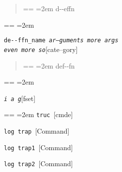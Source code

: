 \documentclass{book}
\makeatletter
\newcommand\GNUTexinfocommandstyletextvar[1]{{\normalfont{}\textsl{#1}}}%
\newenvironment{GNUTexinfopreformatted}{%
  \par\obeylines\obeyspaces\frenchspacing
  \parskip=\z@\parindent=\z@}{}
\makeatother
\begin{document}
%
\begin{quote}
\unskip{\parskip=0pt\noindent}%
\begin{GNUTexinfopreformatted}
\leftskip=2em\relax\ttfamily%
d{-}{-}effn
\end{GNUTexinfopreformatted}
\end{quote}
\begin{GNUTexinfopreformatted}
\leftskip=2em\relax\ttfamily%

\end{GNUTexinfopreformatted}
\noindent\texttt{de{-}{-}ffn\_name \EmbracOn{}\textnormal{\textsl{ar--guments    more args \leavevmode{}\\ even more so}}\EmbracOff{}}\hfill[cate--gory]



%
\begin{quote}
\unskip{\parskip=0pt\noindent}%
\begin{GNUTexinfopreformatted}
\leftskip=2em\relax\ttfamily%
def{-}{-}fn
\end{GNUTexinfopreformatted}
\end{quote}
\begin{GNUTexinfopreformatted}
\leftskip=2em\relax\ttfamily%

\end{GNUTexinfopreformatted}
\noindent\texttt{\GNUTexinfocommandstyletextvar{i} \EmbracOn{}\textnormal{\textsl{a g}}\EmbracOff{}}\hfill[fset]



\index[fn]{i@\texttt{\GNUTexinfocommandstyletextvar{i}}}%
\begin{GNUTexinfopreformatted}
\leftskip=2em\relax\ttfamily%
%
\end{GNUTexinfopreformatted}
\noindent\texttt{truc \EmbracOn{}\textnormal{\textsl{}}\EmbracOff{}}\hfill[cmde]



%
\noindent\texttt{log trap \EmbracOn{}\textnormal{\textsl{}}\EmbracOff{}}\hfill[Command]



%
\noindent\texttt{log trap1 \EmbracOn{}\textnormal{\textsl{}}\EmbracOff{}}\hfill[Command]



%
\noindent\texttt{log trap2 \EmbracOn{}\textnormal{\textsl{}}\EmbracOff{}}\hfill[Command]
\end{document}
